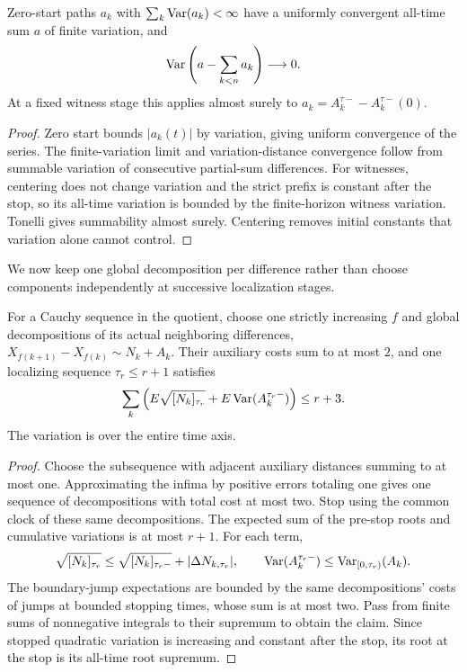 \begin{lemma}
Zero-start paths $a_k$ with $\sum_k\operatorname{Var}(a_k)<\infty$ have a uniformly
convergent all-time sum $a$ of finite variation, and
\[
 \operatorname{Var}\left(a-\sum_{k<n}a_k\right)\longrightarrow0.
\]
At a fixed witness stage this applies almost surely to
$a_k=A_k^{\tau-}-A_k^{\tau-}(0)$.
\end{lemma}
\begin{proof}
Zero start bounds $|a_k(t)|$ by variation, giving uniform convergence of the
series. The finite-variation limit and variation-distance convergence follow
from summable variation of consecutive partial-sum differences.
For witnesses, centering does not change variation and the strict prefix
is constant after the stop, so its all-time variation is bounded by the
finite-horizon witness variation. Tonelli gives summability almost surely.
Centering removes initial constants that variation alone cannot control.
\end{proof}
We now keep one global decomposition per difference rather than choose
components independently at successive localization stages.
\begin{lemma}
For a Cauchy sequence in the quotient, choose one strictly increasing $f$
and global decompositions of its actual neighboring differences,
$X_{f(k+1)}-X_{f(k)}\sim N_k+A_k$.
Their auxiliary costs sum to at most $2$, and one localizing sequence
$\tau_r\leq r+1$ satisfies
\[
 \sum_k\left(E\sqrt{[N_k]_{\tau_r}}+
 E\operatorname{Var}(A_k^{\tau_r-})\right)\leq r+3.
\]
The variation is over the entire time axis.
\end{lemma}
\begin{proof}
Choose the subsequence with adjacent auxiliary distances summing to at most
one. Approximating the infima by positive errors totaling one gives one
sequence of decompositions with total cost at most two.
Stop using the common clock of these same decompositions. The expected
sum of the pre-stop roots and cumulative variations is at most $r+1$.
For each term,
\[
 \sqrt{[N_k]_{\tau_r}}\leq
 \sqrt{[N_k]_{\tau_r-}}+|\Delta N_{k,\tau_r}|,\qquad
 \operatorname{Var}(A_k^{\tau_r-})\leq\operatorname{Var}_{[0,\tau_r)}(A_k).
\]
The boundary-jump expectations are bounded by the same decompositions'
costs of jumps at bounded stopping times, whose sum is at most two.
Pass from finite sums of nonnegative integrals to their supremum to obtain
the claim. Since stopped quadratic variation is increasing and constant
after the stop, its root at the stop is its all-time root supremum.
\end{proof}
